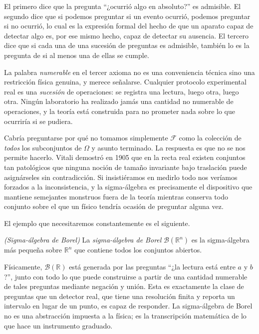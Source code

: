 		El primero dice que la pregunta ``¿ocurrió algo en absoluto?'' es admisible. El segundo dice que si podemos preguntar si un evento ocurrió, podemos preguntar si no ocurrió, lo cual es la expresión formal del hecho de que un aparato capaz de detectar algo es, por ese mismo hecho, capaz de detectar su ausencia. El tercero dice que si cada una de una sucesión de preguntas es admisible, también lo es la pregunta de si al menos una de ellas se cumple.

		La palabra \textit{numerable} en el tercer axioma no es una conveniencia técnica sino una restricción física genuina, y merece señalarse. Cualquier protocolo experimental real es una \textit{sucesión} de operaciones: se registra una lectura, luego otra, luego otra. Ningún laboratorio ha realizado jamás una cantidad no numerable de operaciones, y la teoría está construida para no prometer nada sobre lo que ocurriría si se pudiera.

		Cabría preguntarse por qué no tomamos simplemente $\mathcal{F}$ como la colección de \textit{todos} los subconjuntos de $\Omega$ y asunto terminado. La respuesta es que no se nos permite hacerlo. Vitali demostró en 1905 \citep{vitali1905problema} que en la recta real existen conjuntos tan patológicos que ninguna noción de tamaño invariante bajo traslación puede asignárseles sin contradicción. Si insistiéramos en medirlo todo nos veríamos forzados a la inconsistencia, y la sigma-álgebra es precisamente el dispositivo que mantiene semejantes monstruos fuera de la teoría mientras conserva todo conjunto sobre el que un físico tendría ocasión de preguntar alguna vez.

		El ejemplo que necesitaremos constantemente es el siguiente.

		\begin{myDef}
			\textit{(Sigma-álgebra de Borel)} La \textit{sigma-álgebra de Borel} $\mathcal{B}(\mathbb{R}^{n})$ es la sigma-álgebra más pequeña sobre $\mathbb{R}^{n}$ que contiene todos los conjuntos abiertos.
		\end{myDef}

		Físicamente, $\mathcal{B}(\mathbb{R})$ está generada por las preguntas ``¿la lectura está entre $a$ y $b$?'', junto con todo lo que puede construirse a partir de una cantidad numerable de tales preguntas mediante negación y unión. Esta es exactamente la clase de preguntas que un detector real, que tiene una resolución finita y reporta un intervalo en lugar de un punto, es capaz de responder. La sigma-álgebra de Borel no es una abstracción impuesta a la física; es la transcripción matemática de lo que hace un instrumento graduado.

